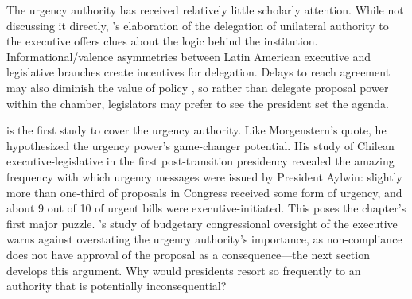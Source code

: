 \documentclass[letter,12pt]{article}
\begin{document}

\noindent The urgency authority has received relatively little scholarly attention. While not discussing it directly, \citeauthor{carey.shugart.1998a}'s \citeyearpar{carey.shugart.1998a} elaboration of the delegation of unilateral authority to the executive offers clues about the logic behind the institution. Informational/valence asymmetries between Latin American executive and legislative branches \citep{londregan.2000a} create incentives for delegation. Delays to reach agreement may also diminish the value of policy \citep{baron.ferejohn.1989}, so rather than delegate proposal power within the chamber, legislators may prefer to see the president set the agenda. 


\citet{siavelis.2002} is the first study to cover the urgency authority. Like Morgenstern's quote, he hypothesized the urgency power's game-changer potential. His study of Chilean executive-legislative in the first post-transition presidency revealed the amazing frequency with which urgency messages were issued by President Aylwin: slightly more than one-third of proposals in Congress received some form of urgency, and about 9 out of 10 of urgent bills were executive-initiated. This poses the chapter's first major puzzle. \citeauthor{berrios.gamboa.fiscChile.2006}'s \citeyearpar{berrios.gamboa.fiscChile.2006} study of budgetary congressional oversight of the executive warns against overstating the urgency authority's importance, as non-compliance does not have approval of the proposal as a consequence---the next section develops this argument. Why would presidents resort so frequently to an authority that is potentially inconsequential?
\end{document}
